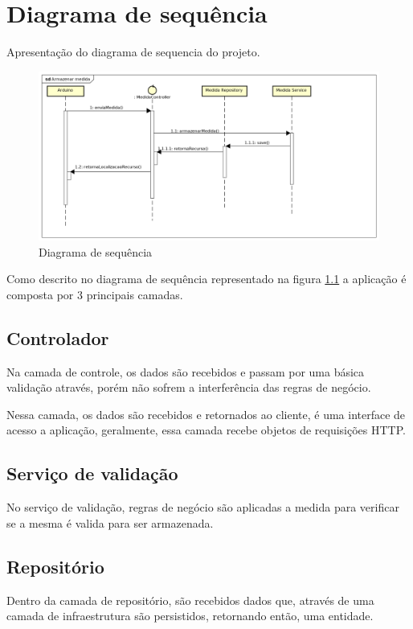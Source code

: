 \chapter{Diagrama de sequência}

Apresentação do diagrama de sequencia do projeto.

\begin{figure}[H]
    \label{figure_diagrama_sequencia}
    \centering
    \caption{Diagrama de sequência}
    \includegraphics[scale=0.40]{diagrams/sequencia.png}
    \hfill
\end{figure}

Como descrito no diagrama de sequência representado na figura \ref{figure_diagrama_sequencia} a aplicação é composta por 3 principais camadas.

\section{Controlador}

Na camada de controle, os dados são recebidos e passam por uma básica validação através, porém não sofrem a interferência das regras de negócio.

Nessa camada, os dados são recebidos e retornados ao cliente, é uma interface de acesso a aplicação, geralmente, essa camada recebe objetos de requisições HTTP.

\section{Serviço de validação}

No serviço de validação, regras de negócio são aplicadas a medida para verificar se a mesma é valida para ser armazenada.

\section{Repositório}

Dentro da camada de repositório, são recebidos dados que, através de uma camada de infraestrutura são persistidos, retornando então, uma entidade.
